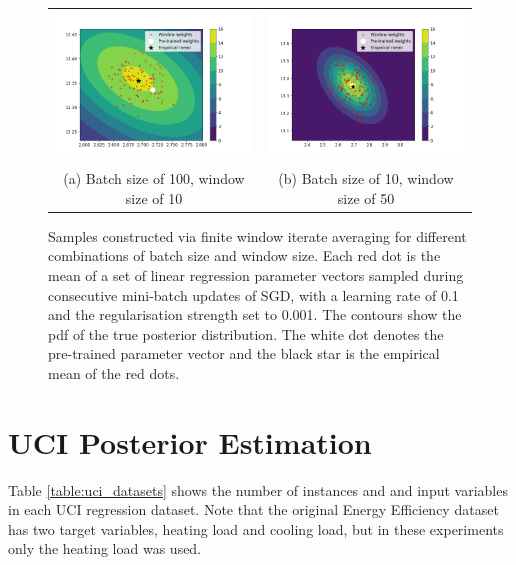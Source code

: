 \documentclass[msc,deptreport.inf]{infthesis} %
\begin{document}
\begin{figure}[!htbp] 
	\begin{tabular}{cc}
		 \includegraphics[width=70mm]{plots/linear_model_average_weight_iterates__lr=0.1__lambda=0.001__batch_size=100__window_size=10.png}
		 & \includegraphics[width=70mm]{plots/linear_model_average_weight_iterates__lr=0.1__lambda=0.001__batch_size=10__window_size=50.png} \\
		 (a) Batch size of 100, window size of 10
		 & (b) Batch size of 10, window size of 50 \\[6pt]
	\end{tabular}
	\caption{Samples constructed via finite window iterate averaging for different combinations of batch size and window size. Each red dot is the mean of a set of linear regression parameter vectors sampled during consecutive mini-batch updates of SGD, with a learning rate of 0.1 and the regularisation strength set to 0.001. The contours show the pdf of the true posterior distribution. The white dot denotes the pre-trained parameter vector and the black star is the empirical mean of the red dots.}
	\label{fig:linear_regression_average_iterates}
\end{figure}


\section{UCI Posterior Estimation}\label{app:uci_posterior}

Table \ref{table:uci_datasets} shows the number of instances and and input variables in each UCI regression dataset. Note that the original Energy Efficiency dataset has two target variables, heating load and cooling load, but in these experiments only the heating load was used.
\end{document}
